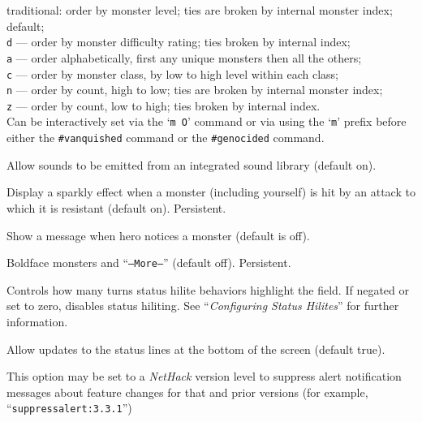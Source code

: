 \documentclass[titlepage]{article}
\begin{document}
\begin{description}[font=\mdseries\itshape]
traditional: order by monster level; ties are broken by internal
monster index;
default;
\\
\texttt{d} ---
order by monster difficulty rating; ties broken by internal index;
\\
\texttt{a} ---
order alphabetically, first any unique monsters then all the others;
\\
\texttt{c} ---
order by monster class, by low to high level within each class;
\\
\texttt{n} ---
order by count, high to low; ties are broken by internal monster index;
\\
\texttt{z} ---
order by count, low to high; ties broken by internal index.
\\
Can be interactively set via the `\texttt{m O}' command or via using
the `\texttt{m}' prefix before either the \texttt{\#vanquished} command
or the \texttt{\#genocided} command.
\item[sounds]
Allow sounds to be emitted from an integrated sound library (default on).
\item[sparkle]
Display a sparkly effect when a monster (including yourself) is hit by an
attack to which it is resistant (default on).  Persistent.
\item[spot\textunderscore monsters]
Show a message when hero notices a monster (default is off).
\item[standout]
Boldface monsters and ``\texttt{--More--}'' (default off).  Persistent.
\item[statushilites]
Controls how many turns status hilite behaviors highlight
the field. If negated or set to zero, disables status hiliting.
See ``\textit{Configuring Status Hilites}'' for further information.
\item[status\textunderscore updates]
Allow updates to the status lines at the bottom of the screen (default true).
\item[suppress\textunderscore alert]
This option may be set to a \textit{NetHack} version level to suppress
alert notification messages about feature changes for that
and prior versions (for example, ``\texttt{suppress\textunderscore alert:3.3.1}'')
\item[symset]

\end{description}
\end{document}
